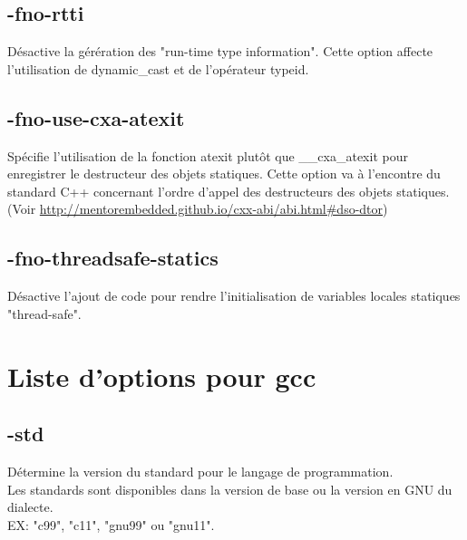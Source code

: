 \documentclass[headings=appendixprefix]{scrreprt}
\begin{document}

\section{-fno-rtti}

Désactive la gérération des "run-time type information". Cette option affecte l'utilisation de dynamic\_cast et de l'opérateur typeid.\\


\section{-fno-use-cxa-atexit}

Spécifie l'utilisation de la fonction atexit plutôt que \_\_cxa\_atexit pour enregistrer le destructeur des objets statiques. Cette option va à l'encontre du standard C++ concernant l'ordre d'appel des destructeurs des objets statiques. (Voir \url{http://mentorembedded.github.io/cxx-abi/abi.html#dso-dtor})\\


\section{-fno-threadsafe-statics}

Désactive l'ajout de code pour rendre l'initialisation de variables locales statiques "thread-safe".


\chapter{Liste d'options pour gcc}
\setcounter{secnumdepth}{0}


\section{-std}

Détermine la version du standard pour le langage de programmation.\\

Les standards sont disponibles dans la version de base ou la version en GNU du dialecte.\\
EX: "c99", "c11", "gnu99" ou "gnu11".\\
\end{document}
